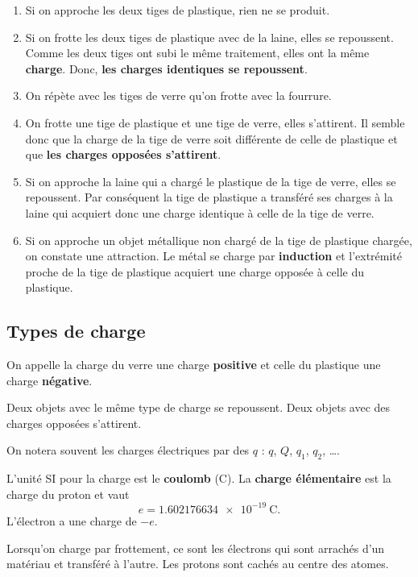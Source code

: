 \begin{enumerate}
\item Si on approche les deux tiges de plastique, rien ne se produit.
\item Si on frotte les deux tiges de plastique avec de la laine, elles se
  repoussent. Comme les deux tiges ont subi le même traitement, elles ont
  la même \textbf{charge}. Donc, \textbf{les charges identiques se
    repoussent}.
\item On répète avec les tiges de verre qu'on frotte avec la fourrure.
\item On frotte une tige de plastique et une tige de verre, elles
  s'attirent. Il semble donc que la charge de la tige de verre soit
  différente de celle de plastique et que \textbf{les charges opposées
    s'attirent}.
\item Si on approche la laine qui a chargé le plastique de la tige de
  verre,  elles se repoussent. Par conséquent la tige de plastique a
  transféré ses charges à la laine qui acquiert donc une charge identique à
  celle de la tige de verre.
\item Si on approche un objet métallique non chargé de la tige de plastique
  chargée, on constate une attraction. Le métal se charge par
  \textbf{induction} et l'extrémité proche de la tige de plastique acquiert
  une charge opposée à celle du plastique.
\end{enumerate}


\subsection*{Types de charge}

On appelle la charge du verre une charge \textbf{positive} et celle du
plastique une charge \textbf{négative}.

Deux objets avec le même type de charge se repoussent. Deux objets avec des
charges opposées s'attirent.

On notera souvent les charges électriques par des $q$ : $q$, $Q$, $q_1$, $q_2$,
\ldots.

L'unité SI pour la charge est le \textbf{coulomb} (C). La \textbf{charge
  élémentaire} est la charge du proton et vaut
$$e = \SI{1.602 176 634e-19}{\coulomb}.$$
L'électron a une charge de $-e$.

Lorsqu'on charge par frottement, ce sont les électrons qui sont arrachés d'un
matériau et transféré à l'autre. Les protons sont \og cachés \fg au centre des
atomes.

